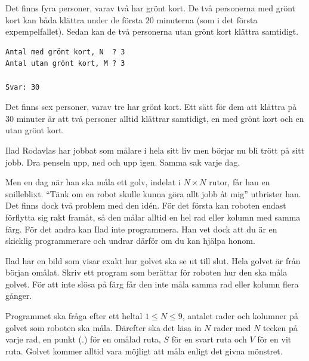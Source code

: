  Det finns fyra personer, varav två har grönt kort.
De två personerna med grönt kort kan båda klättra under de första $20$ minuterna (som i det första expempelfallet).
Sedan kan de två personerna utan grönt kort klättra samtidigt.

\vspace{0.5cm}

\begin{verbatim}
Antal med grönt kort, N  ? 3
Antal utan grönt kort, M ? 3

Svar: 30
\end{verbatim}

 Det finns sex personer, varav tre har grönt kort.
Ett sätt för dem att klättra på $30$ minuter är att två personer alltid klättrar samtidigt, en med grönt kort och en utan grönt kort.


\newpage
{}

Ilad Rodavlas har jobbat som målare i hela sitt liv men börjar nu bli trött på sitt jobb.
Dra penseln upp, ned och upp igen.
Samma sak varje dag.

Men en dag när han ska måla ett golv, indelat i $N \times N$ rutor, får han en snilleblixt.
``Tänk om en robot skulle kunna göra allt jobb åt mig'' utbrister han.
Det finns dock två problem med den  idén.
För det första kan roboten endast förflytta sig rakt framåt, så den målar alltid en hel rad eller kolumn med samma färg.
För det andra kan Ilad inte programmera.
Han vet dock att du är en skicklig programmerare och undrar därför om du kan hjälpa honom. 

Ilad har en bild som visar exakt hur golvet ska se ut till slut. Hela golvet är från början omålat.
Skriv ett program som berättar för roboten hur den ska måla golvet.
För att inte slösa på färg får den inte måla samma rad eller kolumn flera gånger.


Programmet ska fråga efter ett heltal $1 \leq N \leq 9$, antalet rader och kolumner på golvet som roboten ska måla. Därefter ska det läsa in $N$ rader med $N$ tecken på varje rad, en punkt ($.$) för en omålad ruta, $S$ för en svart ruta och $V$ för en vit ruta. Golvet kommer alltid vara möjligt att måla enligt det givna mönstret. 

